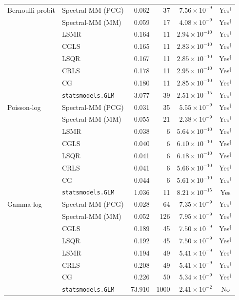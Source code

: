 \begin{longtable}{llrrrc}
\midrule
Bernoulli-probit & Spectral-MM (PCG) & 0.062 & 37 & $7.56\times10^{-9}$ & Yes$^{\ddagger}$ \\
 & Spectral-MM (MM) & 0.059 & 17 & $4.08\times10^{-9}$ & Yes$^{\ddagger}$ \\
 & LSMR & 0.164 & 11 & $2.94\times10^{-10}$ & Yes$^{\ddagger}$ \\
 & CGLS & 0.165 & 11 & $2.83\times10^{-10}$ & Yes$^{\ddagger}$ \\
 & LSQR & 0.167 & 11 & $2.85\times10^{-10}$ & Yes$^{\ddagger}$ \\
 & CRLS & 0.178 & 11 & $2.95\times10^{-10}$ & Yes$^{\ddagger}$ \\
 & CG & 0.180 & 11 & $2.85\times10^{-10}$ & Yes$^{\ddagger}$ \\
 & \texttt{statsmodels.GLM} & 3.077 & 39 & $2.51\times10^{-15}$ & Yes$^{\ddagger}$ \\
\midrule
Poisson-log & Spectral-MM (PCG) & 0.031 & 35 & $5.55\times10^{-9}$ & Yes$^{\ddagger}$ \\
 & Spectral-MM (MM) & 0.055 & 21 & $2.38\times10^{-9}$ & Yes$^{\ddagger}$ \\
 & LSMR & 0.038 & 6 & $5.64\times10^{-10}$ & Yes$^{\ddagger}$ \\
 & CGLS & 0.040 & 6 & $6.10\times10^{-10}$ & Yes$^{\ddagger}$ \\
 & LSQR & 0.041 & 6 & $6.18\times10^{-10}$ & Yes$^{\ddagger}$ \\
 & CRLS & 0.041 & 6 & $5.66\times10^{-10}$ & Yes$^{\ddagger}$ \\
 & CG & 0.044 & 6 & $5.61\times10^{-10}$ & Yes$^{\ddagger}$ \\
 & \texttt{statsmodels.GLM} & 1.036 & 11 & $8.21\times10^{-15}$ & Yes \\
\midrule
Gamma-log & Spectral-MM (PCG) & 0.028 & 64 & $7.35\times10^{-9}$ & Yes$^{\ddagger}$ \\
 & Spectral-MM (MM) & 0.052 & 126 & $7.95\times10^{-9}$ & Yes$^{\ddagger}$ \\
 & CGLS & 0.189 & 45 & $7.50\times10^{-9}$ & Yes$^{\ddagger}$ \\
 & LSQR & 0.192 & 45 & $7.50\times10^{-9}$ & Yes$^{\ddagger}$ \\
 & LSMR & 0.194 & 49 & $5.41\times10^{-9}$ & Yes$^{\ddagger}$ \\
 & CRLS & 0.208 & 49 & $5.41\times10^{-9}$ & Yes$^{\ddagger}$ \\
 & CG & 0.226 & 50 & $5.34\times10^{-9}$ & Yes$^{\ddagger}$ \\
 & \texttt{statsmodels.GLM} & 73.910 & 1000 & $2.41\times10^{-2}$ & No \\

\end{longtable}
